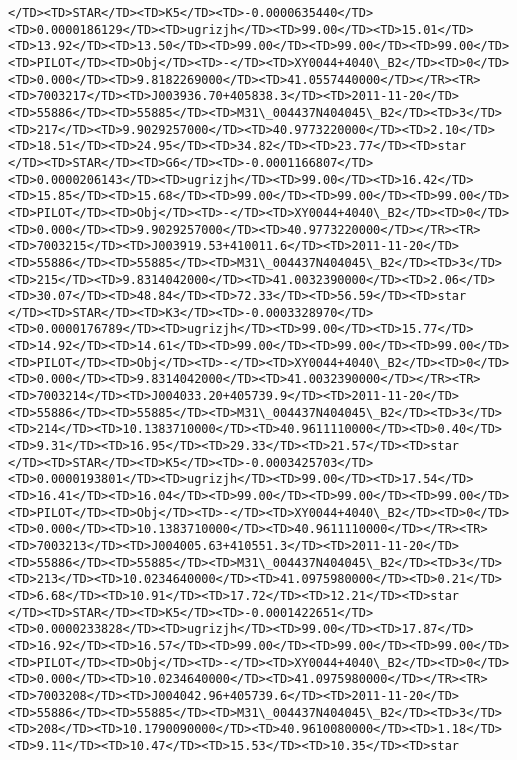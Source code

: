 \documentclass[11pt]{article}
\begin{document}
\begin{Verbatim}[commandchars=\\\{\}]
</TD><TD>STAR</TD><TD>K5</TD><TD>-0.0000635440</TD><TD>0.0000186129</TD><TD>ugrizjh</TD><TD>99.00</TD><TD>15.01</TD><TD>13.92</TD><TD>13.50</TD><TD>99.00</TD><TD>99.00</TD><TD>99.00</TD><TD>PILOT</TD><TD>Obj</TD><TD>-</TD><TD>XY0044+4040\_B2</TD><TD>0</TD><TD>0.000</TD><TD>9.8182269000</TD><TD>41.0557440000</TD></TR><TR><TD>7003217</TD><TD>J003936.70+405838.3</TD><TD>2011-11-20</TD><TD>55886</TD><TD>55885</TD><TD>M31\_004437N404045\_B2</TD><TD>3</TD><TD>217</TD><TD>9.9029257000</TD><TD>40.9773220000</TD><TD>2.10</TD><TD>18.51</TD><TD>24.95</TD><TD>34.82</TD><TD>23.77</TD><TD>star     </TD><TD>STAR</TD><TD>G6</TD><TD>-0.0001166807</TD><TD>0.0000206143</TD><TD>ugrizjh</TD><TD>99.00</TD><TD>16.42</TD><TD>15.85</TD><TD>15.68</TD><TD>99.00</TD><TD>99.00</TD><TD>99.00</TD><TD>PILOT</TD><TD>Obj</TD><TD>-</TD><TD>XY0044+4040\_B2</TD><TD>0</TD><TD>0.000</TD><TD>9.9029257000</TD><TD>40.9773220000</TD></TR><TR><TD>7003215</TD><TD>J003919.53+410011.6</TD><TD>2011-11-20</TD><TD>55886</TD><TD>55885</TD><TD>M31\_004437N404045\_B2</TD><TD>3</TD><TD>215</TD><TD>9.8314042000</TD><TD>41.0032390000</TD><TD>2.06</TD><TD>30.07</TD><TD>48.84</TD><TD>72.33</TD><TD>56.59</TD><TD>star     </TD><TD>STAR</TD><TD>K3</TD><TD>-0.0003328970</TD><TD>0.0000176789</TD><TD>ugrizjh</TD><TD>99.00</TD><TD>15.77</TD><TD>14.92</TD><TD>14.61</TD><TD>99.00</TD><TD>99.00</TD><TD>99.00</TD><TD>PILOT</TD><TD>Obj</TD><TD>-</TD><TD>XY0044+4040\_B2</TD><TD>0</TD><TD>0.000</TD><TD>9.8314042000</TD><TD>41.0032390000</TD></TR><TR><TD>7003214</TD><TD>J004033.20+405739.9</TD><TD>2011-11-20</TD><TD>55886</TD><TD>55885</TD><TD>M31\_004437N404045\_B2</TD><TD>3</TD><TD>214</TD><TD>10.1383710000</TD><TD>40.9611110000</TD><TD>0.40</TD><TD>9.31</TD><TD>16.95</TD><TD>29.33</TD><TD>21.57</TD><TD>star     </TD><TD>STAR</TD><TD>K5</TD><TD>-0.0003425703</TD><TD>0.0000193801</TD><TD>ugrizjh</TD><TD>99.00</TD><TD>17.54</TD><TD>16.41</TD><TD>16.04</TD><TD>99.00</TD><TD>99.00</TD><TD>99.00</TD><TD>PILOT</TD><TD>Obj</TD><TD>-</TD><TD>XY0044+4040\_B2</TD><TD>0</TD><TD>0.000</TD><TD>10.1383710000</TD><TD>40.9611110000</TD></TR><TR><TD>7003213</TD><TD>J004005.63+410551.3</TD><TD>2011-11-20</TD><TD>55886</TD><TD>55885</TD><TD>M31\_004437N404045\_B2</TD><TD>3</TD><TD>213</TD><TD>10.0234640000</TD><TD>41.0975980000</TD><TD>0.21</TD><TD>6.68</TD><TD>10.91</TD><TD>17.72</TD><TD>12.21</TD><TD>star     </TD><TD>STAR</TD><TD>K5</TD><TD>-0.0001422651</TD><TD>0.0000233828</TD><TD>ugrizjh</TD><TD>99.00</TD><TD>17.87</TD><TD>16.92</TD><TD>16.57</TD><TD>99.00</TD><TD>99.00</TD><TD>99.00</TD><TD>PILOT</TD><TD>Obj</TD><TD>-</TD><TD>XY0044+4040\_B2</TD><TD>0</TD><TD>0.000</TD><TD>10.0234640000</TD><TD>41.0975980000</TD></TR><TR><TD>7003208</TD><TD>J004042.96+405739.6</TD><TD>2011-11-20</TD><TD>55886</TD><TD>55885</TD><TD>M31\_004437N404045\_B2</TD><TD>3</TD><TD>208</TD><TD>10.1790090000</TD><TD>40.9610080000</TD><TD>1.18</TD><TD>9.11</TD><TD>10.47</TD><TD>15.53</TD><TD>10.35</TD><TD>star     
\end{Verbatim}
\end{document}
